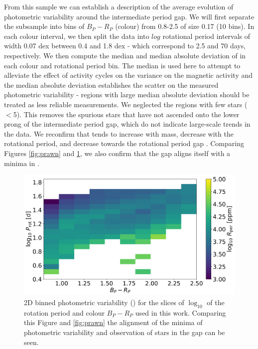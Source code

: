 From this sample we can establish a description of the average evolution of photometric variability around the intermediate period gap.
We will first separate the subsample into bins of $B_P - R_P$ (colour) from 0.8-2.5 of size 0.17 (10 bins).
In each colour interval, we then split the data into $log$ rotational period intervals of width 0.07 dex between 0.4 and 1.8 dex - which correspond to 2.5 and 70 days, respectively.
We then compute the median and median absolute deviation of \rper{} in each colour and rotational period bin.
The median is used here to attempt to alleviate the effect of activity cycles on the variance on the magnetic activity and the median absolute deviation establishes the scatter on the measured photometric variability - regions with large median absolute deviation should be treated as less reliable measurements.
We neglected the regions with few stars ($<$5).
This removes the spurious stars that have not ascended onto the lower prong of the intermediate period gap, which do not indicate large-scale trends in the data.
We reconfirm that \rper{} tends to increase with mass, decrease with the rotational period, and decrease towards the rotational period gap \citep{reinhold_stellar_2020, basri and nguyen , santos_surface_2021}.
Comparing Figures \ref{fig:prawn} and \ref{fig:binned_rper_full_sample}, we also confirm that the gap aligns itself with a minima in \rper{}.

\begin{figure}
\centering
    \includegraphics[width=\textwidth]{Figures/rot_gap_figures/rot_dist_binned.png}
    \caption{
    2D binned photometric variability (\rper{}) for the slices of $\log_10$ of the rotation period and colour \gaia $B_P-R_P$ used in this work. Comparing this Figure and \ref{fig:prawn} the alignment of the minima of photometric variability and observation of stars in the gap can be seen.}
    \label{fig:binned_rper_full_sample}
\end{figure}


